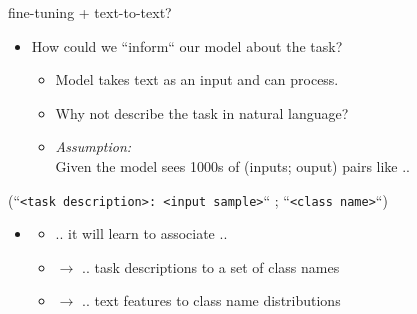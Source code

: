 \documentclass[11pt,compress,t,notes=noshow, xcolor=table]{beamer}
\begin{document}
\begin{frame}{fine-tuning + text-to-text?}

\vfill

\begin{itemize}
	\item \ques How could we ``inform`` our model about the task?
			\begin{itemize}
				\item Model takes text as an input and can process.
				\item Why not describe the task in natural language?
				\item \textit{Assumption:}\\
							Given the model sees 1000s of (inputs; ouput) pairs like ..
			\end{itemize}
\end{itemize}

		\begin{center}
				{\small
					(``\texttt{<task description>: <input sample>}`` ; ``\texttt{<class name>}``)
				}
		\end{center}
				
\begin{itemize}
			\item[]
			\begin{itemize}
				\item .. it will learn to associate ..
				\item[] $\to$ .. task descriptions to a set of class names
				\item[] $\to$ .. text features to class name distributions
			\end{itemize}
\end{itemize}

\vfill

\end{frame}

\end{document}
